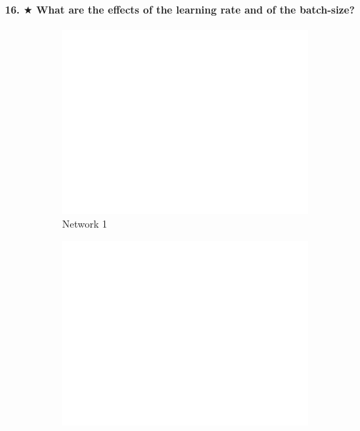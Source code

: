 \documentclass{article}
\theoremstyle{plain}%
\theoremstyle{definition}
\theoremstyle{remark}
\begin{document}
\paragraph{16. $ \bigstar $ What are the effects of the learning rate and of the batch-size?}
\begin{figure}
    \centering
    \begin{subfigure}[b]{0.475\textwidth}
        \centering
        \includegraphics[width=\textwidth]{figs/batch32_lr0.1.pdf}
        \caption[Network2]%
        {{\small Network 1}}    
        \label{fig:mean and std of net14}
    \end{subfigure}
    \hfill
    \begin{subfigure}[b]{0.475\textwidth}  
        \centering 
        \includegraphics[width=\textwidth]{figs/batch32_lr0.1.pdf}

\end{subfigure}
\end{figure}
\end{document}
